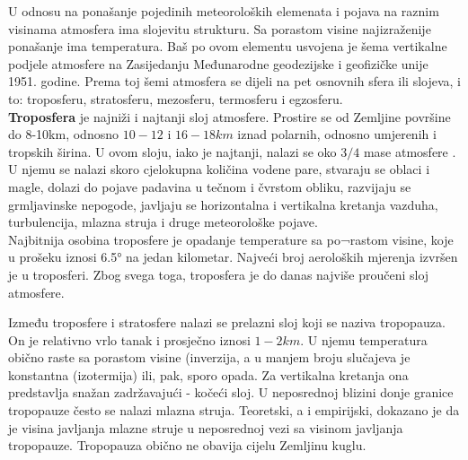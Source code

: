 U odnosu na ponašanje pojedinih meteoroloških elemenata i pojava na raznim visinama atmosfera ima slojevitu strukturu. Sa porastom visine najizraženije ponašanje ima temperatura. Baš po ovom elementu usvojena je šema vertikalne podjele atmosfere na Zasijedanju Međunarodne geodezijske i geofizičke unije 1951. godine. Prema toj šemi atmosfera se dijeli na pet osnovnih sfera ili slojeva, i to: troposferu, stratosferu, mezosferu, termosferu i egzosferu.\\
\textbf{Troposfera} je najniži i najtanji sloj atmosfere. Prostire se od Zemljine površine do 8-10km, odnosno $10-12$ i $16-18km$ iznad polarnih, odnosno umjerenih i tropskih širina. U ovom sloju, iako je najtanji, nalazi se oko $3/4$ mase atmosfere .  U njemu se nalazi skoro cjelokupna količina vodene pare, stvaraju se oblaci i magle, dolazi do pojave padavina u tečnom i čvrstom obliku, razvijaju se grmljavinske nepogode, javljaju se horizontalna i vertikalna kretanja vazduha, turbulencija, mlazna struja i druge meteorološke pojave.\\
Najbitnija osobina troposfere je opadanje temperature sa po¬rastom visine, koje u prošeku iznosi 6.5° na jedan kilometar. Najveći broj aeroloških mjerenja izvršen je u troposferi. Zbog svega toga, troposfera je do danas najviše proučeni sloj atmosfere. 
	
Između troposfere i stratosfere nalazi se prelazni sloj koji se naziva tropopauza. On je relativno vrlo tanak i prosječno iznosi $1-2km$. U njemu temperatura obično raste sa porastom visine (inverzija, a u manjem broju slučajeva je konstantna (izotermija) ili, pak, sporo opada. Za vertikalna kretanja ona predstavlja snažan zadržavajući - kočeći sloj. U neposrednoj blizini donje granice tropopauze često se nalazi mlazna struja. Teoretski, a i empirijski, dokazano je da je visina javljanja mlazne struje u neposrednoj vezi sa visinom javljanja tropopauze. Tropopauza obično ne obavija cijelu Zemljinu kuglu.\\


